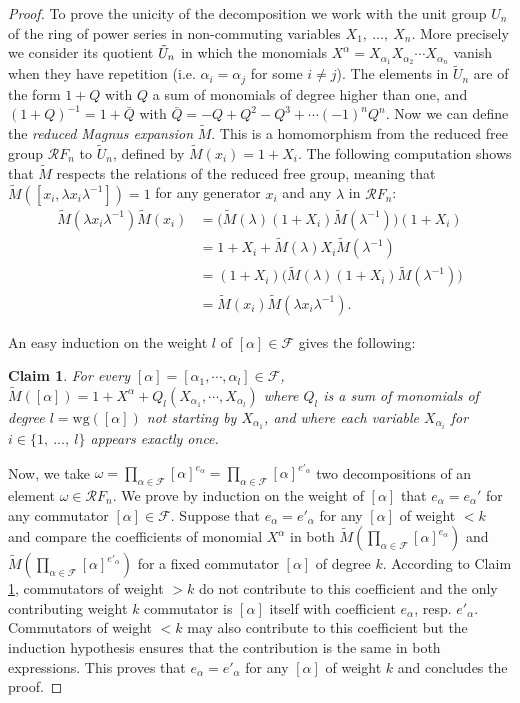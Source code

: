 \documentclass[11pt, a4paper, twoside,reqno]{amsart}
\newtheorem{claim}[thm]{Claim}
\begin{document}
\begin{proof}
To prove the unicity of the decomposition we work with the unit group $U_n$ of the ring of power series in non-commuting variables $X_1,\ \ldots,\ X_n$. More precisely we consider its quotient $\Tilde U_n$ in which the monomials $X^{\alpha}=X_{\alpha_1}X_{\alpha_2}\cdots X_{\alpha_n}$ vanish when they have repetition (i.e. $\alpha_i=\alpha_j$ for some $i\neq j$). The elements in $\tilde U_n$ are of the form $1+Q$ with $Q$ a sum of monomials of degree higher than one, and $(1+Q)^{-1}=1+\bar Q$ with $\bar Q=-Q+Q^2-Q^3+\cdots(-1)^nQ^n$. 
Now we can define the \emph{reduced Magnus expansion} $\tilde{M}$. This is a homomorphism from the reduced free group $\mathcal RF_n$ to $\tilde U_n$, defined by $\tilde{M}(x_i)=1+X_i$. The following computation shows that $\tilde M$ respects the relations of the reduced free group, meaning that $\tilde{M}([x_i,\lambda x_i \lambda^{-1}])=1$ for any generator $x_i$ and any $\lambda$ in $\mathcal{R}F_n$:
\begin{align*}
    \tilde M(\lambda x_i \lambda^{-1})\tilde M(x_i) &=\Big(\tilde M(\lambda)(1+X_i)\tilde M(\lambda^{-1})\Big)(1+X_i)\\
    &=1+X_i+\tilde M(\lambda)X_i\tilde M(\lambda^{-1})\\
    &=(1+X_i)\Big(\tilde M(\lambda)(1+X_i)\tilde M(\lambda^{-1})\Big)\\
    &=\tilde M(x_i)\tilde M(\lambda x_i \lambda^{-1}).
\end{align*}

An easy induction on the weight $l$ of $[\alpha]\in\mathcal F$ gives the following:
\begin{claim}\label{factcool}
For every $[\alpha]=[\alpha_1,\cdots,\alpha_l]\in\mathcal F$, $\tilde M([\alpha])=1+X^{\alpha}+Q_l(X_{\alpha_1},\cdots,X_{\alpha_l})$ where $Q_{l}$ is a sum of monomials of degree $l=\mbox{wg}([\alpha])$ not starting by $X_{\alpha_1}$, and where each variable $X_{\alpha_i}$ for $i\in\{1,\ \ldots,\ l\}$ appears exactly once. 
\end{claim}
\noindent

Now, we take $\omega=\prod_{\alpha\in\mathcal{F}}[\alpha]^{e_\alpha}=\prod_{\alpha\in\mathcal{F}}[\alpha]^{e'_\alpha}$ two decompositions of an element  $\omega\in\mathcal{R}F_n$. We prove by induction on the weight of $[\alpha]$ that $e_{\alpha}=e_\alpha'$ for any commutator $[\alpha]\in\mathcal F$. Suppose that $e_{\alpha}=e'_{\alpha}$ for any $[\alpha]$ of weight $< k$ and compare the coefficients of monomial $X^\alpha$ in both $\tilde M(\prod_{\alpha\in\mathcal{F}}[\alpha]^{e_\alpha})$ and $\tilde M(\prod_{\alpha\in\mathcal{F}}[\alpha]^{e'_\alpha})$ for a fixed commutator $[\alpha]$ of degree $k$. According to Claim \ref{factcool}, commutators of weight $>k$ do not contribute to this coefficient and the only contributing weight $k$ commutator is $[\alpha]$ itself with coefficient $e_\alpha$, resp. $e'_\alpha$. Commutators of weight $<k$ may also contribute to this coefficient but the induction hypothesis ensures that the contribution is the same in both expressions. This proves that $e_{\alpha}=e'_{\alpha}$ for any $[\alpha]$ of weight $k$ and concludes the proof.
\end{proof}
\end{document}
